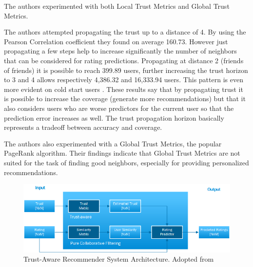 The authors experimented with both Local Trust Metrics and Global Trust Metrics.

The authors attempted propagating the trust up to a distance of 4. By using the Pearson Correlation coefficient they found on average 160.73. However just propagating a few steps help to increase significantly the number of neighbors that can be considered for rating predictions. Propagating at distance 2 (friends of friends) it is possible to reach 399.89 users, further increasing the trust horizon to 3 and 4 allows respectively 4,386.32 and 16,333.94 users. This pattern is even more evident on cold start users \cite{Massa2004}. These results say that by propagating trust it is possible to increase the coverage (generate more recommendations) but that it also considers users who are worse predictors for the current user so that the prediction error increases as well. The trust propagation horizon basically represents a tradeoff between accuracy and coverage.

The authors also experimented with a Global Trust Metrics, the popular PageRank algorithm. Their findings indicate that Global Trust Metrics are not suited for the task of finding good neighbors, especially for providing personalized recommendations.

\begin{figure}[H]
    \includegraphics[width=5in]{image/trustawarearchitecture.png}
    \centering
    \caption[Trust-Aware Recommender System Architecture]{Trust-Aware Recommender System Architecture. Adopted from \cite{Massa2004}}
    \label{figure:trustarchictecture}
\end{figure}


